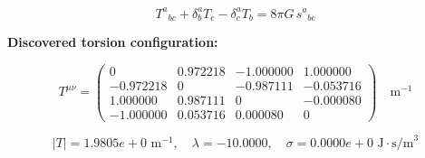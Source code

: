 
\begin{equation}
  T^a{}_{bc} + \delta^a_b T_c - \delta^a_c T_b = 8\pi G \, s^a{}_{bc}
\end{equation}

\textbf{Discovered torsion configuration:}

\begin{equation}
  T^{\mu\nu} = \begin{pmatrix}
    0 & 0.972218 & -1.000000 & 1.000000 \\
    -0.972218 & 0 & -0.987111 & -0.053716 \\
    1.000000 & 0.987111 & 0 & -0.000080 \\
    -1.000000 & 0.053716 & 0.000080 & 0
  \end{pmatrix} \quad \text{m}^{-1}
\end{equation}

\begin{equation}
  |T| = 1.9805e+0 \text{ m}^{-1}, \quad
  \lambda = -10.0000, \quad
  \sigma = 0.0000e+0 \text{ J}\cdot\text{s/m}^3
\end{equation}